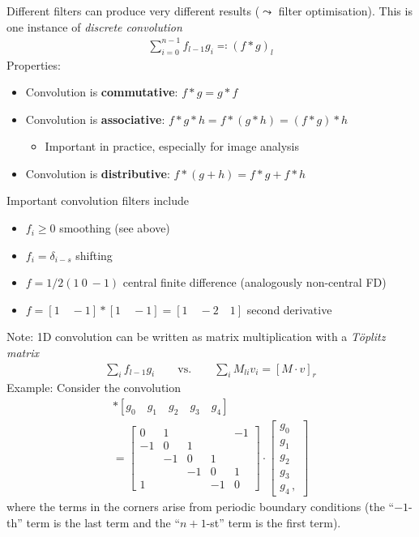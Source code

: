 Different filters can produce very different results ($\leadsto$ filter
optimisation). This is one instance of \emph{discrete convolution}
\begin{gather*}
  \sum_{i=0}^{n-1}f_{l-1}g_i \eqqcolon (f \ast g)_l
\end{gather*}
Properties:
\begin{itemize}
\item Convolution is \textbf{commutative}: $f \ast g = g \ast f$
\item Convolution is \textbf{associative}:
  $f \ast g \ast h = f \ast (g \ast h) = (f \ast g) \ast h$
  \begin{itemize}
  \item Important in practice, especially for image analysis
  \end{itemize}
\item Convolution is \textbf{distributive}:
  $f \ast (g + h) = f \ast g + f \ast h$
\end{itemize}
Important convolution filters include
\begin{itemize}
\item $f_i \ge 0$ smoothing (see above)
\item $f_i = \delta_{i-s}$ shifting
\item $f = 1/2(1 \ 0 \ -1)$ central finite difference (analogously non-central
  FD)
\item $f = [1\quad -1] \ast [1\quad -1] = [1\quad -2\quad 1]$ second derivative
\end{itemize}
Note: 1D convolution can be written as matrix multiplication with a
\emph{Töplitz matrix}
\begin{gather*}
  \sum_i f_{l-1}g_i \qquad \text{vs.} \qquad \sum_i M_{li}v_i = [M\cdot v]_r
\end{gather*}
Example: Consider the convolution
\begin{gather*}
  [1 \quad 0 \quad -1] \ast [g_0\quad g_1\quad g_2\quad g_3 \quad g_4] \\
  =
  \begin{bmatrix}
    0 & 1 & & & -1 \\
    -1 & 0 & 1 & & \\
    & -1 & 0 & 1 & \\
    & & -1 & 0 & 1 \\
    1 & & & -1 & 0
  \end{bmatrix}\cdot
  \begin{bmatrix}
    g_0 \\ g_1 \\ g_2 \\ g_3 \\ g_4\,,
  \end{bmatrix}
\end{gather*}
where the terms in the corners arise from periodic boundary conditions (\ie the
``$-1$-th'' term is the last term and the ``$n+1$-st'' term is the first term).

